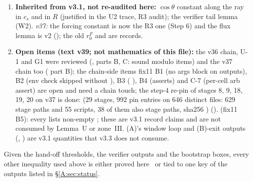 \documentclass[11pt]{article}
\begin{document}
\begin{enumerate}[label=(G-A\arabic*),leftmargin=3.4em]
\item \textbf{Inherited from v3.1, not re-audited here:} $\cos\theta$ constant along the ray in $c_s$ and in $R$ (justified in the U2 trace, R3 audit); the verifier tail lemma (W2). \emph{v37:} the forcing constant is now the R3 one (Step 6) and the flux lemma is v2 (); the old $r^F_0$ and  are records.
\item \textbf{Open items (text v39; not mathematics of this file):} the v36 chain, U-1 and G1 were reviewed (, parts B, C: sound modulo items) and the v37 chain too ( part B); the chain-side items fix11 B1 (no args block on  outputs), B2 (env check skipped without ), B3 ( ), B4 (asserts) and C-7 (per-cell arb assert) are open and need a chain touch; the step-4 re-pin of stages 8, 9, 18, 19, 20 on v37 is done:  (29 stages, 992 pin entries on 646 distinct files: 629 stage paths and 55 scripts, 38 of them also stage paths, sha256 ) (). \emph{} (fix11 B5): every  lists non-empty ; these are v3.1 record claims and are not consumed by Lemma~U or zone~III. (A)'s window loop and (B)-exit outputs (, ) are v3.1 quantities that v3.3 does not consume.
\end{enumerate}
Given the hand-off thresholds, the verifier outputs and the bootstrap boxes, every other inequality used above is either proved here \tP\ or tied to one key of the outputs listed in \S\ref{A:sec:status}.

\ifdefined\stepmain\else
\end{document}
